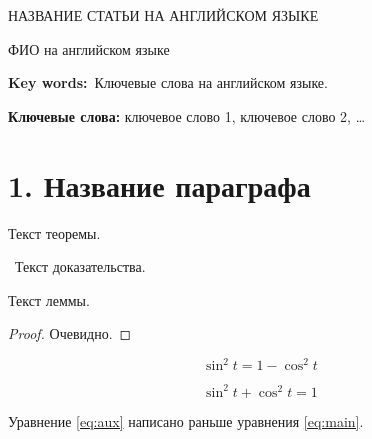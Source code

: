 
 \bigskip


 \begin{center}
 НАЗВАНИЕ СТАТЬИ НА АНГЛИЙСКОМ ЯЗЫКЕ
 \end{center}
 \begin{center}
  ФИО на английском языке
 \end{center}


\vspace*{-4pt}

{\noindent\footnotesize {\bf Key
 words:}~Ключевые слова на английском языке.\par}










{\noindent\footnotesize{\bf Ключевые
 слова:} ключевое слово 1, ключевое слово 2, \ldots\par}



\section*{1. Название параграфа}



Текст теоремы. \Endproc

\beginproof~Текст доказательства.~\endproof


Текст леммы.\Endproc




\begin{proof}
Очевидно.
\end{proof}

\begin{equation}
	\label{eq:aux}
	\sin^2 t = 1 - \cos^2 t
\end{equation}

\begin{equation}
	\label{eq:main}
	\sin^2 t + \cos^2 t = 1
\end{equation}


Уравнение \eqref{eq:aux} написано раньше уравнения \eqref{eq:main}.






